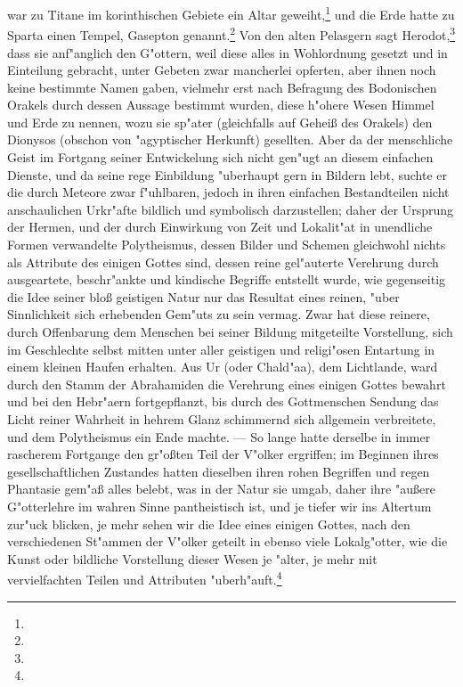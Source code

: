 \documentclass[a4paper, 11pt, oneside, polutonikogreek, german]{article}
\begin{document}
war zu Titane im korinthischen Gebiete ein Altar geweiht,\footnote{} und die Erde hatte zu Sparta einen Tempel, Gasepton genannt.\footnote{} Von den alten Pelasgern sagt Herodot,\footnote{} dass sie anf"anglich den G"ottern, weil diese alles in Wohlordnung gesetzt und in Einteilung gebracht, unter Gebeten zwar mancherlei opferten, aber ihnen noch keine bestimmte Namen gaben, vielmehr erst nach Befragung des Bodonischen Orakels durch dessen Aussage bestimmt wurden, diese h"ohere Wesen Himmel und Erde zu nennen, wozu sie sp"ater (gleichfalls auf Geheiß des Orakels) den Dionysos (obschon von "agyptischer Herkunft) gesellten. Aber da der menschliche Geist im Fortgang seiner Entwickelung sich nicht gen"ugt an diesem einfachen Dienste, und da seine rege Einbildung "uberhaupt gern in Bildern lebt, suchte er die durch Meteore zwar f"uhlbaren, jedoch in ihren einfachen Bestandteilen nicht anschaulichen Urkr"afte bildlich und symbolisch darzustellen; daher der Ursprung der Hermen, und der durch Einwirkung von Zeit und Lokalit"at in unendliche Formen verwandelte Polytheismus, dessen Bilder und Schemen gleichwohl nichts als Attribute des einigen Gottes sind, dessen reine gel"auterte Verehrung durch ausgeartete, beschr"ankte und kindische Begriffe entstellt wurde, wie gegenseitig die Idee seiner bloß geistigen Natur nur das Resultat eines reinen, "uber Sinnlichkeit sich erhebenden Gem"uts zu sein vermag. Zwar hat diese reinere, durch Offenbarung dem Menschen bei seiner Bildung mitgeteilte Vorstellung, sich im Geschlechte selbst mitten unter aller geistigen und religi"osen Entartung in einem kleinen Haufen erhalten. Aus Ur (oder Chald"aa), dem Lichtlande, ward durch den Stamm der Abrahamiden die Verehrung eines einigen Gottes bewahrt und bei den Hebr"aern fortgepflanzt, bis durch des Gottmenschen Sendung das Licht reiner Wahrheit in hehrem Glanz schimmernd sich allgemein verbreitete, und dem Polytheismus ein Ende machte. --- So lange hatte derselbe in immer rascherem Fortgange den gr"oßten Teil der V"olker ergriffen; im Beginnen ihres gesellschaftlichen Zustandes hatten dieselben ihren rohen Begriffen und regen Phantasie gem"aß alles belebt, was in der Natur sie umgab, daher ihre "außere G"otterlehre im wahren Sinne pantheistisch ist, und je tiefer wir ins Altertum zur"uck blicken, je mehr sehen wir die Idee eines einigen Gottes, nach den verschiedenen St"ammen der V"olker geteilt in ebenso viele Lokalg"otter, wie die Kunst oder bildliche Vorstellung dieser Wesen je "alter, je mehr mit vervielfachten Teilen und Attributen "uberh"auft.\footnote{}
\end{document}
